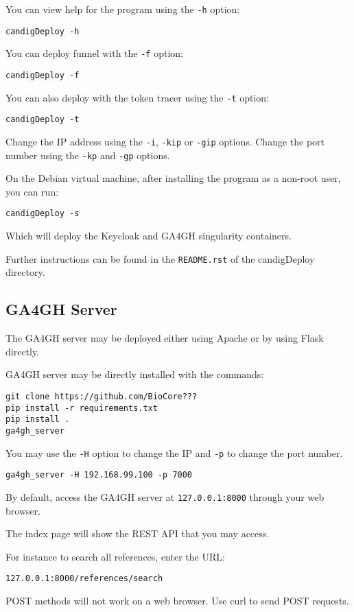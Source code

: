 \documentclass{article}
\begin{document}
You can view help for the program using the \texttt{-h} option:
\begin{verbatim}
candigDeploy -h
\end{verbatim}
You can deploy funnel with the \texttt{-f} option:
\begin{verbatim}
candigDeploy -f
\end{verbatim}
You can also deploy with the token tracer using the \texttt{-t} option:
\begin{verbatim}
candigDeploy -t
\end{verbatim}
Change the IP address using the \texttt{-i}, \texttt{-kip} or \texttt{-gip} options.
Change the port number using the \texttt{-kp} and \texttt{-gp} options.

On the Debian virtual machine, after installing the program as a non-root user, you can run:
\begin{verbatim}
candigDeploy -s
\end{verbatim}
Which will deploy the Keycloak and GA4GH singularity containers.

Further instructions can be found in the \texttt{README.rst} of the candigDeploy directory.

\subsection{GA4GH Server}

The GA4GH server may be deployed either using Apache or by using Flask directly.

GA4GH server may be directly installed with the commands:
\begin{verbatim}
git clone https://github.com/BioCore???
pip install -r requirements.txt
pip install .
ga4gh_server
\end{verbatim}
You may use the \texttt{-H} option to change the IP and \texttt{-p} to change the port number.
\begin{verbatim}
ga4gh_server -H 192.168.99.100 -p 7000
\end{verbatim}
By default, access the GA4GH server at \texttt{127.0.0.1:8000} through your web browser.

The index page will show the REST API that you may access.

For instance to search all references, enter the URL:
\begin{verbatim}
127.0.0.1:8000/references/search
\end{verbatim}
POST methods will not work on a web browser. Use curl to send POST requests.
\end{document}
